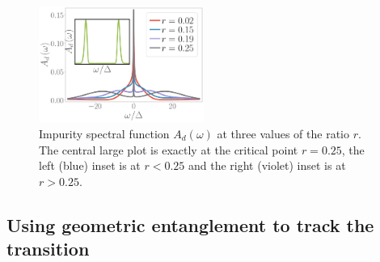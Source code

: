 \documentclass[reprint,superscriptaddress,floatfix]{revtex4-2}
\begin{document}
\begin{figure}[!htb]
	\centering
	\includegraphics[width=0.48\textwidth]{Add.pdf}
	\caption{Impurity spectral function \(A_d(\omega)\) at three values of the ratio \(r\). The central large plot is exactly at the critical point \(r=0.25\), the left (blue) inset is at \(r < 0.25\) and the right (violet) inset is at \(r > 0.25\).}
	\label{spec-func}
\end{figure}

\subsection{Using geometric entanglement to track the transition}
\end{document}
